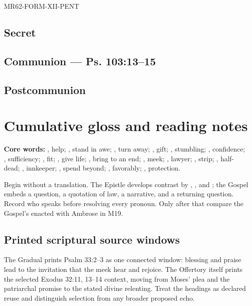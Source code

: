 \begin{reviewsourceunit}{MR62-FORM-XII-PENT}
\subsection*{Secret}

\subsection*{Communion --- Ps. 103:13--15}

\subsection*{Postcommunion}

\section{Cumulative gloss and reading notes}
\textbf{Core words:} , help; , stand in awe;
, turn away; , gift; , stumbling;
, confidence; , sufficiency;
, fit; , give life; , bring to an
end; , meek; , lawyer;
, strip; , half-dead; ,
innkeeper; , spend beyond; , favorably;
, protection.

Begin without a translation.  The Epistle develops contrast by
, , and ; the Gospel embeds
a question, a quotation of law, a narrative, and a returning question.  Record
who speaks before resolving every pronoun.  Only after that compare the
Gospel's enacted  with Ambrose in M19.

\subsection*{Printed scriptural source windows}
The Gradual prints Psalm 33:2--3 as one connected window: blessing and praise
lead to the invitation that the meek hear and rejoice.  The Offertory itself
prints the selected Exodus 32:11, 13--14 context, moving from Moses' plea and
the patriarchal promise to the stated divine relenting.  Treat the headings as
declared reuse and distinguish selection from any broader proposed echo.
\end{reviewsourceunit}

